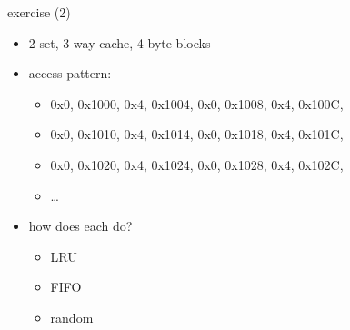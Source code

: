 
\begin{frame}{exercise (2)}
    \begin{itemize}
    \item 2 set, 3-way cache, 4 byte blocks
    \item access pattern:
        \begin{itemize}
        \item 0x0, 0x1000, 0x4, 0x1004, 0x0, 0x1008, 0x4, 0x100C,
        \item 0x0, 0x1010, 0x4, 0x1014, 0x0, 0x1018, 0x4, 0x101C,
        \item 0x0, 0x1020, 0x4, 0x1024, 0x0, 0x1028, 0x4, 0x102C,
        \item \ldots
        \end{itemize}
    \item how does each do?
        \begin{itemize}
        \item LRU
        \item FIFO
        \item random
        \end{itemize}
    \end{itemize}
\end{frame}

